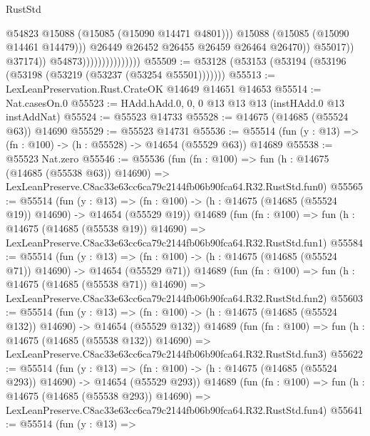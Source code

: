 \begin{lexlean}{RustStd}
\begin{coremodule}
                                                  @54823
                                                  @15088
                                                  (@15085 (@15090 @14471 @4801)))
                                                @15088
                                                (@15085 (@15090 @14461 @14479)))
                                              @26449
                                              @26452
                                              @26455
                                              @26459
                                              @26464
                                              @26470))
                                          @55017))
                                      @37174))
                                  @54873)))))))))))))))
@55509 := @53128 (@53153 (@53194 (@53196 (@53198 (@53219 (@53237 (@53254 @55501)))))))
@55513 := LexLeanPreservation.Rust.CrateOK @14649 @14651 @14653
@55514 := Nat.casesOn.{0}
@55523 := HAdd.hAdd.{0, 0, 0} @13 @13 @13 (instHAdd.{0} @13 instAddNat)
@55524 := @55523 @14733
@55528 := @14675 (@14685 (@55524 @63)) @14690
@55529 := @55523 @14731
@55536 := @55514 (fun (y : @13) => (fn : @100) -> (h : @55528) -> @14654 (@55529 @63)) @14689
@55538 := @55523 Nat.zero
@55546 := @55536
    (fun (fn : @100) =>
    fun (h : @14675 (@14685 (@55538 @63)) @14690) =>
    LexLeanPreserve.C8ac33e63cc6ca79c2144fb06b90fca64.R32.RustStd.fun0)
@55565 := @55514
    (fun (y : @13) =>
    (fn : @100) -> (h : @14675 (@14685 (@55524 @19)) @14690) -> @14654 (@55529 @19))
    @14689
    (fun (fn : @100) =>
    fun (h : @14675 (@14685 (@55538 @19)) @14690) =>
    LexLeanPreserve.C8ac33e63cc6ca79c2144fb06b90fca64.R32.RustStd.fun1)
@55584 := @55514
    (fun (y : @13) =>
    (fn : @100) -> (h : @14675 (@14685 (@55524 @71)) @14690) -> @14654 (@55529 @71))
    @14689
    (fun (fn : @100) =>
    fun (h : @14675 (@14685 (@55538 @71)) @14690) =>
    LexLeanPreserve.C8ac33e63cc6ca79c2144fb06b90fca64.R32.RustStd.fun2)
@55603 := @55514
    (fun (y : @13) =>
    (fn : @100) -> (h : @14675 (@14685 (@55524 @132)) @14690) -> @14654 (@55529 @132))
    @14689
    (fun (fn : @100) =>
    fun (h : @14675 (@14685 (@55538 @132)) @14690) =>
    LexLeanPreserve.C8ac33e63cc6ca79c2144fb06b90fca64.R32.RustStd.fun3)
@55622 := @55514
    (fun (y : @13) =>
    (fn : @100) -> (h : @14675 (@14685 (@55524 @293)) @14690) -> @14654 (@55529 @293))
    @14689
    (fun (fn : @100) =>
    fun (h : @14675 (@14685 (@55538 @293)) @14690) =>
    LexLeanPreserve.C8ac33e63cc6ca79c2144fb06b90fca64.R32.RustStd.fun4)
@55641 := @55514
    (fun (y : @13) =>

\end{coremodule}
\end{lexlean}
